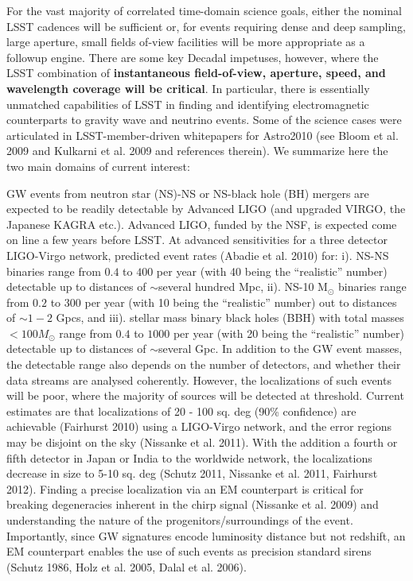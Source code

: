 \documentclass [11pt]{article}
\begin{document}
For the vast majority of correlated time-domain science goals, either the nominal LSST cadences will be sufficient or, for events requiring dense and deep sampling, large aperture, small fields of-view facilities will be more appropriate as a followup engine. There are some key Decadal impetuses, however, where the LSST combination of {\bf instantaneous field-of-view, aperture, speed, and wavelength coverage will be critical}. In particular, there is essentially unmatched capabilities of LSST in finding and identifying electromagnetic counterparts to gravity wave and neutrino events. Some of the science cases were articulated in LSST-member-driven whitepapers for Astro2010 (see Bloom et al. 2009 and Kulkarni et al. 2009 and references therein). We summarize here the two main domains of current interest:

\medskip

 GW events from neutron star (NS)-NS or NS-black hole (BH) mergers are expected to be readily detectable by Advanced LIGO (and upgraded VIRGO, the Japanese KAGRA etc.). Advanced LIGO, funded by the NSF, is expected come on line a few years before LSST. At advanced sensitivities for a three detector LIGO-Virgo network, predicted event rates (Abadie et al. 2010) 
for: i). NS-NS binaries range from $0.4$ to $400$ per year (with 40 being the ``realistic'' number) detectable up to distances of
$\sim$several hundred Mpc, ii). NS-10 M$_{\odot}$ binaries range from $0.2$ to $300$ per year (with 10 being the ``realistic'' number) out to distances of $\sim 1-2$ Gpcs, and iii). stellar mass binary black holes (BBH) with total masses $<100 M_{\odot}$ range from $0.4$ to $1000$ per year (with 20 being the ``realistic'' number) detectable up to distances of $\sim$several Gpc. In addition to the GW event masses, the detectable range also depends on the number of detectors, and whether their data streams are analysed coherently. However, the localizations of such events will be poor, where the majority of sources will be detected at threshold. Current estimates are that localizations of 20 - 100 sq. deg (90\% confidence) are achievable (Fairhurst 2010) using a LIGO-Virgo network, and the error regions may be disjoint on the sky (Nissanke et al. 2011). With the addition a fourth or fifth detector in Japan or India to the worldwide network, the localizations decrease in size to 5-10 sq. deg (Schutz 2011, Nissanke et al. 2011, Fairhurst 2012). Finding a precise localization via an EM counterpart is critical for breaking degeneracies inherent in the chirp signal (Nissanke et al. 2009) and understanding the nature of the progenitors/surroundings of the event. Importantly, since GW signatures encode luminosity distance but not redshift, an EM counterpart enables the use of such events as precision standard sirens (Schutz 1986, Holz et al. 2005, Dalal et al. 2006). 
\end{document}
